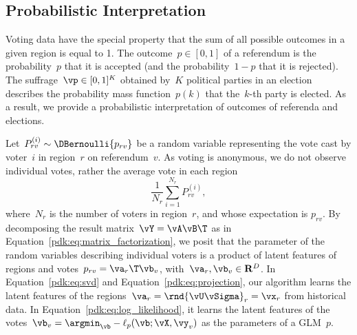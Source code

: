 
\subsection{Probabilistic Interpretation}

Voting data have the special property that the sum of all possible outcomes in a given region is equal to 1.
The outcome~$p \in [0, 1]$ of a referendum is the probability~$p$ that it is accepted (and the probability~$1-p$ that it is rejected).
The suffrage~$\vp \in [0, 1]^K$ obtained by~$K$ political parties in an election describes the probability mass function~$p(k)$ that the~$k$-th party is elected.
As a result, we provide a probabilistic interpretation of outcomes of referenda and elections.

Let~$P_{rv}^{(i)} \sim \DBernoulli{p_{rv}}$ be a random variable representing the vote cast by voter~$i$ in region~$r$ on referendum~$v$.
As voting is anonymous, we do not observe individual votes, rather the average vote in each region
\begin{equation*}
	\frac{1}{N_r} \sum_{i=1}^{N_r} P_{rv}^{(i)},
\end{equation*}
where~$N_r$ is the number of voters in region~$r$, and whose expectation is $p_{rv}$.
By decomposing the result matrix~$\vY = \vA \vB\T$ as in Equation~\eqref{pdk:eq:matrix_factorization}, we posit that the parameter of the random variables describing individual voters is a product of latent features of regions and votes~$p_{rv} = \va_r\T \vb_v$, with~$\va_r, \vb_v \in \mathbf{R}^D$.
In Equation~\eqref{pdk:eq:svd} and Equation~\eqref{pdk:eq:projection}, our algorithm learns the latent features of the regions~$\va_r = \rnd{\vU \vSigma}_r = \vx_r$ from historical data.
In Equation~\eqref{pdk:eq:log_likelihood}, it learns the latent features of the votes~$\vb_v = \argmin_{\vb} -\ell_p(\vb ; \vX, \vy_v)$ as the parameters of a GLM~$p$.

